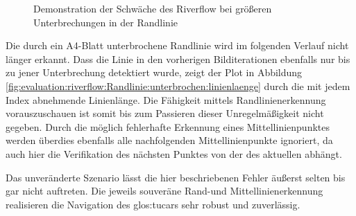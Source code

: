 \begin{figure}[htbp] %
	\hfill
	\caption{Demonstration der Schwäche des Riverflow bei größeren Unterbrechungen in der Randlinie}
	\label{fig:evaluation:riverflow:Randlinie:unterbrochen}
\end{figure}

Die durch ein A4-Blatt unterbrochene Randlinie wird im folgenden Verlauf nicht länger erkannt. Dass die Linie in den vorherigen Bilditerationen ebenfalls nur bis zu jener Unterbrechung detektiert wurde, zeigt der Plot in Abbildung \ref{fig:evaluation:riverflow:Randlinie:unterbrochen:linienlaenge} durch die mit jedem Index abnehmende Linienlänge. Die Fähigkeit mittels Randlinienerkennung vorauszuschauen ist somit bis zum Passieren dieser Unregelmäßigkeit nicht gegeben. Durch die möglich fehlerhafte Erkennung eines Mittellinienpunktes werden überdies ebenfalls alle nachfolgenden Mittellinienpunkte ignoriert, da auch hier die Verifikation des nächsten Punktes von der des aktuellen abhängt. 

Das unveränderte Szenario lässt die hier beschriebenen Fehler äußerst selten bis gar nicht auftreten. Die jeweils souveräne Rand-und Mittellinienerkennung realisieren die Navigation des \gls{glos:tucar}s sehr robust und zuverlässig. 

